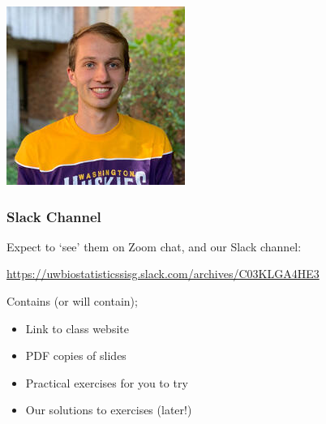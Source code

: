 \documentclass{beamer}
\begin{document}
\begin{frame}
\begin{center}
\begin{minipage}{0.32\linewidth}
	\end{minipage}
	\hfill
	\begin{minipage}{0.32\linewidth}
		\includegraphics[width=\linewidth,height=\linewidth]{Figures/seth-temple.jpeg}
	\end{minipage}
\end{center}

\end{frame}



\begin{frame}[fragile]
\frametitle{\bf Slack Channel}

Expect to `see' them on Zoom chat, and our Slack channel:
{\color{red}
 
\url{https://uwbiostatisticssisg.slack.com/archives/C03KLGA4HE3}


}
\vspace{.3cm}
Contains (or will contain);
\begin{itemize}
\item Link to class website
\item PDF copies of slides
\item Practical exercises for you to try
\item Our solutions to exercises (later!)
\end{itemize}
\end{frame}
\end{document}
